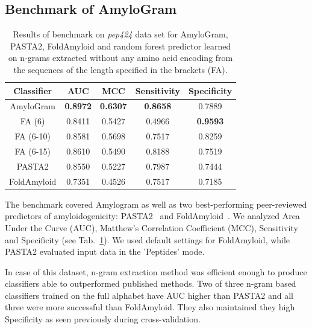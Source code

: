 \documentclass[a4,center,fleqn]{NAR}
\begin{document}
\subsection{Benchmark of AmyloGram}

\begin{table}[ht]
\centering
\caption{Results of benchmark on \textit{pep424} data set for AmyloGram, 
PASTA2, FoldAmyloid and random forest predictor learned on n-grams extracted 
without any amino acid encoding from the sequences of the length specified in 
the brackets (FA).} 
\label{tab:bench_summary}
\begin{tabular}{ccccc}
  \toprule
Classifier & AUC & MCC & Sensitivity & Specificity \\ 
  \midrule
AmyloGram & \textbf{0.8972} & \textbf{0.6307} & \textbf{0.8658} & 0.7889 \\ 
   \rowcolor[gray]{0.85}FA (6) & 0.8411 & 0.5427 & 0.4966 & 
\textbf{0.9593} \\ 
  FA (6-10) & 0.8581 & 0.5698 & 0.7517 & 0.8259 \\ 
   \rowcolor[gray]{0.85}FA (6-15) & 0.8610 & 0.5490 & 0.8188 & 
0.7519 \\ 
\hline \hline
   PASTA2 & 0.8550 & 0.5227 & 0.7987 & 0.7444 \\ 
  \rowcolor[gray]{0.85}FoldAmyloid & 0.7351 & 0.4526 & 0.7517 & 0.7185 \\ 

   \bottomrule
\end{tabular}
\end{table}

The benchmark covered Amylogram as well as two best-performing peer-reviewed 
predictors of amyloidogenicity: PASTA2~\citep{walsh_pasta_2014} and 
FoldAmyloid~\citep{garbuzynskiy_foldamyloid:_2010}. We analyzed Area Under the 
Curve (AUC), Matthew's Correlation Coefficient (MCC), Sensitivity and 
Specificity (see Tab.~\ref{tab:bench_summary}). We used default settings for 
FoldAmyloid, while PASTA2 evaluated input data in the 'Peptides' mode.
    
  In case of this dataset, n-gram extraction method was efficient enough to 
produce classifiers able to outperformed published methods. Two of three n-gram 
based classifiers trained on the full alphabet have AUC higher than PASTA2 and 
all three were more successful than FoldAmyloid. They also maintained they high 
Specificity as seen previously during cross-validation.
    
\end{document}
